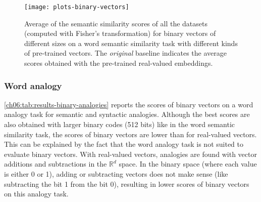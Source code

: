       \begin{figure}[b!]
        \centering
        \texttt{[image: plots-binary-vectors]}
        \caption[Scores of binary vectors on a word semantic similarity task.]
        {Average of the semantic similarity scores of all the datasets (computed
        with Fisher's transformation) for binary vectors of different sizes on a
        word semantic similarity task with different kinds of pre-trained
        vectors. The \textit{original} baseline indicates the average scores
        obtained with the pre-trained real-valued embeddings.}
        \label{ch06:img:plot-binary-vectors}
      \end{figure}

    \subsubsection{Word analogy}
      \autoref{ch06:tab:results-binary-analogies} reports the scores of binary
      vectors on a word analogy task for semantic and syntactic analogies.
      Although the best scores are also obtained with larger binary codes (512
      bits) like in the word semantic similarity task, the scores of binary
      vectors are lower than for real-valued vectors. This can be explained by
      the fact that the word analogy task is not suited to evaluate binary
      vectors. With real-valued vectors, analogies are found with vector
      additions and subtractions in the $\mathbb{R}^d$ space. In the binary
      space (where each value is either 0 or 1), adding or subtracting vectors
      does not make sense (like subtracting the bit 1 from the bit 0), resulting
      in lower scores of binary vectors on this analogy task.

